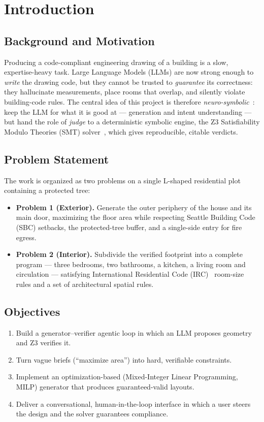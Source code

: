 \documentclass{book}
\begin{document}
\tableofcontents
\listoffigures
\listoftables

\chapter{Introduction}

\section{Background and Motivation}
Producing a code-compliant engineering drawing of a building is a slow, expertise-heavy task. Large Language Models (LLMs) are now strong enough to \emph{write} the drawing code, but they cannot be trusted to \emph{guarantee} its correctness: they hallucinate measurements, place rooms that overlap, and silently violate building-code rules. The central idea of this project is therefore \emph{neuro-symbolic}~\cite{garcez2023neurosymbolic}: keep the LLM for what it is good at --- generation and intent understanding --- but hand the role of \emph{judge} to a deterministic symbolic engine, the Z3 Satisfiability Modulo Theories (SMT) solver~\cite{demoura2008z3}, which gives reproducible, citable verdicts.

\section{Problem Statement}
The work is organized as two problems on a single L-shaped residential plot containing a protected tree:
\begin{itemize}
\item \textbf{Problem 1 (Exterior).} Generate the outer periphery of the house and its main door, maximizing the floor area while respecting Seattle Building Code (SBC) setbacks, the protected-tree buffer, and a single-side entry for fire egress.
\item \textbf{Problem 2 (Interior).} Subdivide the verified footprint into a complete program --- three bedrooms, two bathrooms, a kitchen, a living room and circulation --- satisfying International Residential Code (IRC)~\cite{irc2021} room-size rules and a set of architectural spatial rules.
\end{itemize}

\section{Objectives}
\begin{enumerate}
\item Build a generator--verifier agentic loop in which an LLM proposes geometry and Z3 verifies it.
\item Turn vague briefs (``maximize area'') into hard, verifiable constraints.
\item Implement an optimization-based (Mixed-Integer Linear Programming, MILP) generator that produces guaranteed-valid layouts.
\item Deliver a conversational, human-in-the-loop interface in which a user steers the design and the solver guarantees compliance.
\end{enumerate}
\end{document}
